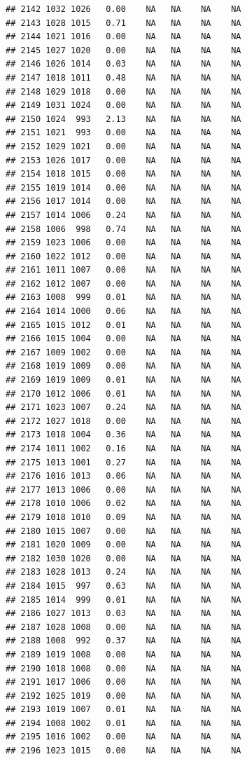 \documentclass{article}\usepackage{graphicx, color}
\makeatletter
\newenvironment{kframe}{%
 \def\at@end@of@kframe{}%
 \ifinner\ifhmode%
  \def\at@end@of@kframe{\end{minipage}}%
  \begin{minipage}{\columnwidth}%
 \fi\fi%
 \def\FrameCommand##1{\hskip\@totalleftmargin \hskip-\fboxsep
 \colorbox{shadecolor}{##1}\hskip-\fboxsep
     \hskip-\linewidth \hskip-\@totalleftmargin \hskip\columnwidth}%
 \MakeFramed {\advance\hsize-\width
   \@totalleftmargin\z@ \linewidth\hsize
   \@setminipage}}%
 {\par\unskip\endMakeFramed%
 \at@end@of@kframe}
\newenvironment{knitrout}{}{} %
\makeatother
\begin{document}
\begin{knitrout}
\begin{kframe}
\begin{verbatim}
## 2142 1032 1026   0.00    NA   NA    NA    NA
## 2143 1028 1015   0.71    NA   NA    NA    NA
## 2144 1021 1016   0.00    NA   NA    NA    NA
## 2145 1027 1020   0.00    NA   NA    NA    NA
## 2146 1026 1014   0.03    NA   NA    NA    NA
## 2147 1018 1011   0.48    NA   NA    NA    NA
## 2148 1029 1018   0.00    NA   NA    NA    NA
## 2149 1031 1024   0.00    NA   NA    NA    NA
## 2150 1024  993   2.13    NA   NA    NA    NA
## 2151 1021  993   0.00    NA   NA    NA    NA
## 2152 1029 1021   0.00    NA   NA    NA    NA
## 2153 1026 1017   0.00    NA   NA    NA    NA
## 2154 1018 1015   0.00    NA   NA    NA    NA
## 2155 1019 1014   0.00    NA   NA    NA    NA
## 2156 1017 1014   0.00    NA   NA    NA    NA
## 2157 1014 1006   0.24    NA   NA    NA    NA
## 2158 1006  998   0.74    NA   NA    NA    NA
## 2159 1023 1006   0.00    NA   NA    NA    NA
## 2160 1022 1012   0.00    NA   NA    NA    NA
## 2161 1011 1007   0.00    NA   NA    NA    NA
## 2162 1012 1007   0.00    NA   NA    NA    NA
## 2163 1008  999   0.01    NA   NA    NA    NA
## 2164 1014 1000   0.06    NA   NA    NA    NA
## 2165 1015 1012   0.01    NA   NA    NA    NA
## 2166 1015 1004   0.00    NA   NA    NA    NA
## 2167 1009 1002   0.00    NA   NA    NA    NA
## 2168 1019 1009   0.00    NA   NA    NA    NA
## 2169 1019 1009   0.01    NA   NA    NA    NA
## 2170 1012 1006   0.01    NA   NA    NA    NA
## 2171 1023 1007   0.24    NA   NA    NA    NA
## 2172 1027 1018   0.00    NA   NA    NA    NA
## 2173 1018 1004   0.36    NA   NA    NA    NA
## 2174 1011 1002   0.16    NA   NA    NA    NA
## 2175 1013 1001   0.27    NA   NA    NA    NA
## 2176 1016 1013   0.06    NA   NA    NA    NA
## 2177 1013 1006   0.00    NA   NA    NA    NA
## 2178 1010 1006   0.02    NA   NA    NA    NA
## 2179 1018 1010   0.09    NA   NA    NA    NA
## 2180 1015 1007   0.00    NA   NA    NA    NA
## 2181 1020 1009   0.00    NA   NA    NA    NA
## 2182 1030 1020   0.00    NA   NA    NA    NA
## 2183 1028 1013   0.24    NA   NA    NA    NA
## 2184 1015  997   0.63    NA   NA    NA    NA
## 2185 1014  999   0.01    NA   NA    NA    NA
## 2186 1027 1013   0.03    NA   NA    NA    NA
## 2187 1028 1008   0.00    NA   NA    NA    NA
## 2188 1008  992   0.37    NA   NA    NA    NA
## 2189 1019 1008   0.00    NA   NA    NA    NA
## 2190 1018 1008   0.00    NA   NA    NA    NA
## 2191 1017 1006   0.00    NA   NA    NA    NA
## 2192 1025 1019   0.00    NA   NA    NA    NA
## 2193 1019 1007   0.01    NA   NA    NA    NA
## 2194 1008 1002   0.01    NA   NA    NA    NA
## 2195 1016 1002   0.00    NA   NA    NA    NA
## 2196 1023 1015   0.00    NA   NA    NA    NA

\end{verbatim}
\end{kframe}
\end{knitrout}
\end{document}

